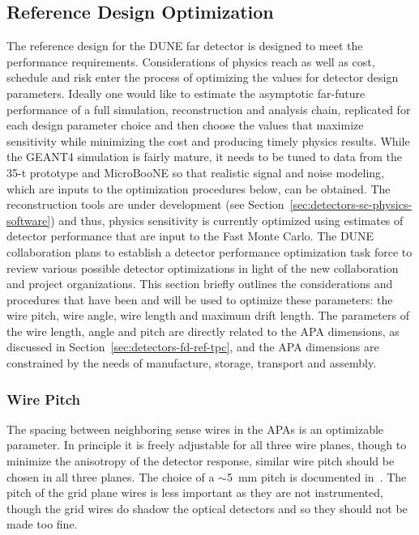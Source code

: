 \subsection{Reference Design Optimization}
\label{sec:detectors-fd-ref-optimization}

The reference design for the DUNE far detector is designed to meet the
performance requirements. Considerations of physics reach as well as
cost, schedule and risk enter the process of optimizing the values for
detector design parameters. Ideally one would like to estimate the
asymptotic far-future performance of a full simulation, reconstruction
and analysis chain, replicated for each design parameter choice and
then choose the values that maximize sensitivity while minimizing the
cost and producing timely physics results. While the GEANT4 simulation
is fairly mature, it needs to be tuned to data from the 35-t prototype
and MicroBooNE so that realistic signal and noise modeling, which are
inputs to the optimization procedures below, can be obtained. The
reconstruction tools are under development (see
Section~\ref{sec:detectors-sc-physics-software}) and thus, physics
sensitivity is currently optimized using estimates of detector
performance that are input to the Fast Monte Carlo. The DUNE
collaboration plans to establish a detector performance optimization
task force to review various possible detector optimizations in light
of the new collaboration and project organizations.  This section
briefly outlines the considerations and procedures that have been and
will be used to optimize these parameters: the wire pitch, wire
angle, wire length and  maximum drift length.  The parameters
of the wire length, angle and pitch are directly related to the
APA dimensions, as discussed in
Section~\ref{sec:detectors-fd-ref-tpc}, and the APA dimensions are
constrained by the needs of manufacture, storage, transport and
assembly.

\subsubsection{Wire Pitch}

The spacing between neighboring sense wires in the APAs is an
optimizable parameter.  In principle it is freely adjustable for all
three wire planes, though to minimize the anisotropy of the detector
response, similar wire pitch should be chosen in all three planes.
The choice of a $\sim$5~mm pitch is documented in~\cite{docdb-3407}.  The pitch of the grid plane wires is less
important as they are not instrumented, though the grid wires do
shadow the optical detectors and so they should not be made too fine.

